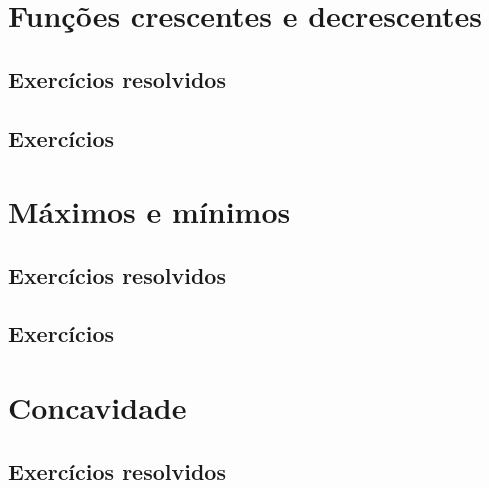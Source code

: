 \section{Funções crescentes e decrescentes}
\construirSec

\subsection*{Exercícios resolvidos}

\construirExeresol


\subsection*{Exercícios}

\construirExer


\section{Máximos e mínimos}
\construirSec

\subsection*{Exercícios resolvidos}

\construirExeresol


\subsection*{Exercícios}

\construirExer



\section{Concavidade}
\construirSec

\subsection*{Exercícios resolvidos}


